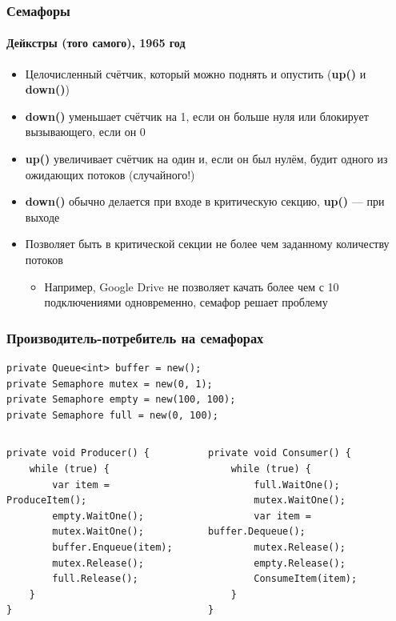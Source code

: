 \documentclass{../../slides-style}
\begin{document}
    \begin{frame}[fragile]
        \frametitle{Семафоры}
        \framesubtitle{Дейкстры (того самого), 1965 год}
        \begin{itemize}
            \item Целочисленный счётчик, который можно поднять и опустить (\textbf{up()} и \textbf{down()})
            \item \textbf{down()} уменьшает счётчик на 1, если он больше нуля или блокирует вызывающего, если он 0
            \item \textbf{up()} увеличивает счётчик на один и, если он был нулём, будит одного из ожидающих потоков (случайного!)
            \item \textbf{down()} обычно делается при входе в критическую секцию, \textbf{up()} --- при выходе
            \item Позволяет быть в критической секции не более чем заданному количеству потоков
            \begin{itemize}
                \item Например, Google Drive не позволяет качать более чем с 10 подключениями одновременно, семафор решает проблему
            \end{itemize}
        \end{itemize}
    \end{frame}

    \begin{frame}[fragile]
        \frametitle{Производитель-потребитель на семафорах}
        \begin{footnotesize}
            \begin{verbatim}
private Queue<int> buffer = new();
private Semaphore mutex = new(0, 1);
private Semaphore empty = new(100, 100);
private Semaphore full = new(0, 100);
            \end{verbatim}
            \begin{columns}
                \begin{column}{0.5\textwidth}
                    \begin{verbatim}
private void Producer() {
    while (true) {
        var item = ProduceItem();
        empty.WaitOne();
        mutex.WaitOne();
        buffer.Enqueue(item);
        mutex.Release();
        full.Release();
    }
}
                    \end{verbatim}
                \end{column}
                \begin{column}{0.5\textwidth}
                    \begin{verbatim}
private void Consumer() {
    while (true) {
        full.WaitOne();
        mutex.WaitOne();
        var item = buffer.Dequeue();
        mutex.Release();
        empty.Release();
        ConsumeItem(item);
    }
}
                    \end{verbatim}
                \end{column}
            \end{columns}
        \end{footnotesize}
    \end{frame}
\end{document}
